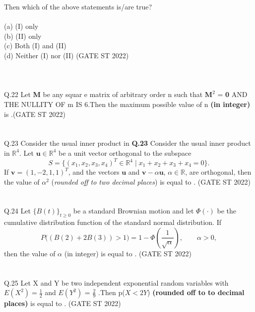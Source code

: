 \documentclass[journal,12pt,onecolumn]{IEEEtran}
\theoremstyle{remark}
\begin{document}
Then which of the above statements is/are true?\\
\\
(a) (I) only \\
(b) (II) only \\
(c) Both (I) and (II)\\
(d) Neither (I) nor (II) \hfill (GATE ST 2022)\\
\\
\\
\\
Q.22 Let \textbf{M} be any squar e matrix of arbitrary order n such that $\textbf{M}^2$  = \textbf{0} AND THE NULLITY OF m IS 6.Then the maximum possible value of n \textbf{(in integer)} is \underline{\hspace{2cm}}.\hfill (GATE ST 2022)\\
\\
\\
	\vspace{2em}
Q.23 Consider the usual inner product in \textbf{Q.23} Consider the usual inner product in $\mathbb{R}^4$. 
Let $\mathbf{u} \in \mathbb{R}^4$ be a unit vector orthogonal to the subspace
\[
S = \{ (x_1, x_2, x_3, x_4)^T \in \mathbb{R}^4 
\mid x_1 + x_2 + x_3 + x_4 = 0 \}.
\]
If $\mathbf{v} = (1, -2, 1, 1)^T$, and the vectors $\mathbf{u}$ and 
$\mathbf{v} - \alpha \mathbf{u}$, $\alpha \in \mathbb{R}$, are orthogonal, 
then the value of $\alpha^2$ (\textit{rounded off to two decimal places}) is equal to 
\underline{\hspace{2cm}}. \hfill (GATE ST 2022)\\
\\
\\
Q.24 Let $\{ B(t) \}_{t \geq 0}$ be a standard Brownian motion and let 
$\Phi(\cdot)$ be the cumulative distribution function of the standard normal distribution. 
If 
\[
P\big( (B(2) + 2B(3)) > 1 \big)
= 1 - \Phi\left( \frac{1}{\sqrt{\alpha}} \right), 
\qquad \alpha > 0,
\]
then the value of $\alpha$ (in integer) is equal to 
\underline{\hspace{2cm}}. \hfill (GATE ST 2022)\\
\\
\\
Q.25 Let X and Y be two independent exponential random variables with $E(X^2) = \frac{1}{2} $ and $E(Y^2)$ = $\frac{2}{9}$ .Then p($ X < 2Y$) \textbf{(rounded off to to decimal places)} is equal to \underline{\hspace{2cm}}. \hfill (GATE ST 2022)\\
\\
\end{document}
